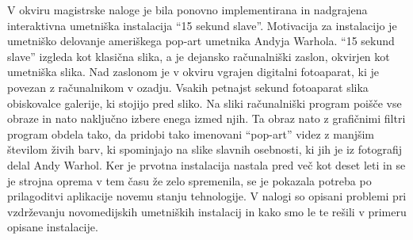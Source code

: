 V okviru magistrske naloge je bila ponovno implementirana in nadgrajena
interaktivna umetniška instalacija ``15 sekund slave''. Motivacija za
instalacijo je umetniško delovanje ameriškega pop-art umetnika Andyja Warhola.
``15 sekund slave'' izgleda kot klasična slika, a je dejansko računalniški
zaslon, okvirjen kot umetniška slika. Nad zaslonom je v okviru vgrajen
digitalni fotoaparat, ki je povezan z računalnikom v ozadju. Vsakih petnajst
sekund fotoaparat slika obiskovalce galerije, ki stojijo pred sliko. Na sliki
računalniški program poišče vse obraze in nato naključno izbere enega izmed
njih. Ta obraz nato z grafičnimi filtri program obdela tako, da pridobi tako
imenovani ``pop-art'' videz z manjšim številom živih barv, ki spominjajo na
slike slavnih osebnosti, ki jih je iz fotografij delal Andy Warhol. Ker je
prvotna instalacija nastala pred več kot deset leti in se je strojna oprema v
tem času že zelo spremenila, se je pokazala potreba po prilagoditvi aplikacije
novemu stanju tehnologije. V nalogi so opisani problemi pri vzdrževanju
novomedijskih umetniških instalacij in kako smo le te rešili v primeru opisane
instalacije.
